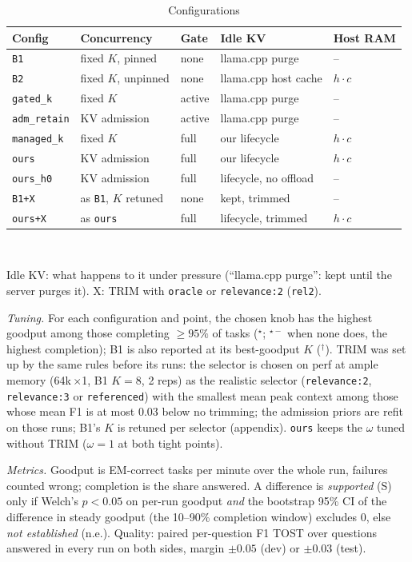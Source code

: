\documentclass[conference]{IEEEtran}
\newcommand{\K}{$K$}
\newcommand{\x}{$\times$}
\newcommand{\pick}{$^\star$}
\newcommand{\pickf}{$^{\star-}$}
\newcommand{\topk}{$^\dagger$}
\newcommand{\cfg}[1]{\texttt{#1}}
\begin{document}
\begin{table}[t]
  \caption{Configurations}
  \label{tab:cfg}
  \centering
  \scriptsize
  \setlength{\tabcolsep}{3pt}
  \begin{tabular}{@{}lllll@{}}
    \toprule
    Config & Concurrency & Gate & Idle KV & Host RAM \\
    \midrule
    \cfg{B1} & fixed \K, pinned & none & llama.cpp purge & -- \\
    \cfg{B2} & fixed \K, unpinned & none & llama.cpp host cache & $h\cdot c$ \\
    \cfg{gated\_k} & fixed \K & active & llama.cpp purge & -- \\
    \cfg{adm\_retain} & KV admission & active & llama.cpp purge & -- \\
    \cfg{managed\_k} & fixed \K & full & our lifecycle & $h\cdot c$ \\
    \cfg{ours} & KV admission & full & our lifecycle & $h\cdot c$ \\
    \cfg{ours\_h0} & KV admission & full & lifecycle, no offload & -- \\
    \cfg{B1+X} & as \cfg{B1}, \K{} retuned & none & kept, trimmed & -- \\
    \cfg{ours+X} & as \cfg{ours} & full & lifecycle, trimmed & $h\cdot c$ \\
    \bottomrule
  \end{tabular}\\[2pt]
  \parbox{\columnwidth}{\raggedright\scriptsize Idle KV: what happens to it under pressure (``llama.cpp
  purge'': kept until the server purges it). X: TRIM with \cfg{oracle} or \cfg{relevance:2} (\cfg{rel2}).}
\end{table}

\emph{Tuning.} For each configuration and point, the chosen knob has the highest goodput among those
completing ${\ge}95\%$ of tasks (\pick; \pickf{} when none does, the highest completion); B1 is also
reported at its best-goodput \K{} (\topk). TRIM was set up by the same rules before its runs: the
selector is chosen on perf at ample memory (64k\,\x1, B1 $K{=}8$, 2 reps) as the realistic selector
(\cfg{relevance:2}, \cfg{relevance:3} or \cfg{referenced}) with the smallest mean peak context among
those whose mean F1 is at most 0.03 below no trimming; the admission priors are refit on those runs;
B1's \K{} is retuned per selector (appendix). \cfg{ours} keeps the $\omega$ tuned without TRIM
($\omega{=}1$ at both tight points).

\emph{Metrics.} Goodput is EM-correct tasks per minute over the whole run, failures counted wrong;
completion is the share answered. A difference is \emph{supported} (S) only if Welch's $p<0.05$ on
per-run goodput \emph{and} the bootstrap 95\% CI of the difference in steady goodput (the 10--90\%
completion window) excludes 0, else \emph{not established} (n.e.). Quality: paired per-question F1
TOST over questions answered in every run on both sides, margin $\pm0.05$ (dev) or $\pm0.03$ (test).
\end{document}
